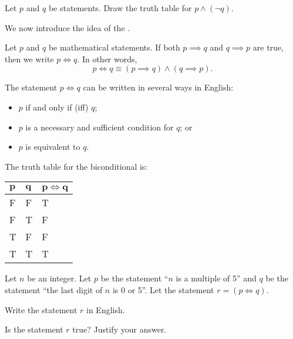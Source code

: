 \begin{exercise}\label{exercise-negation-of-implication}
    Let $p$ and $q$ be statements. Draw the truth table for $p \land (\lnot q)$.
\end{exercise}

We now introduce the idea of the .
\begin{definition}
    Let $p$ and $q$ be mathematical statements. If both $p \implies q$ and $q \implies p$ are true, then we write $p \iff q$. In other words,
    \[
        p \iff q \equiv (p \implies q) \land (q \implies p).
    \]
\end{definition}
\begin{remark}
    The statement $p \iff q$ can be written in several ways in English:
    \begin{itemize}
        \item $p$ if and only if (iff) $q$;
        \item $p$ is a necessary and sufficient condition for $q$; or
        \item $p$ is equivalent to $q$.
    \end{itemize}
\end{remark}

The truth table for the biconditional is:
\begin{table}[h]
    \centering
    \begin{tabular}{|l|l||l|}
        \hline
        $\boldsymbol{p}$ & $\boldsymbol{q}$ & $\boldsymbol{p \iff q}$ \\ \hline
        F   & F   & T         \\ \hline
        F   & T   & F         \\ \hline
        T   & F   & F         \\ \hline
        T   & T   & T         \\ \hline
    \end{tabular}
\end{table}

\begin{exercise}
    Let $n$ be an integer. Let $p$ be the statement ``$n$ is a multiple of 5'' and $q$ be the statement ``the last digit of $n$ is 0 or 5''. Let the statement $r = (p \iff q)$.
    \begin{partquestions}{\roman*}
        \item Write the statement $r$ in English.
        \item Is the statement $r$ true? Justify your answer.
    \end{partquestions}
\end{exercise}

